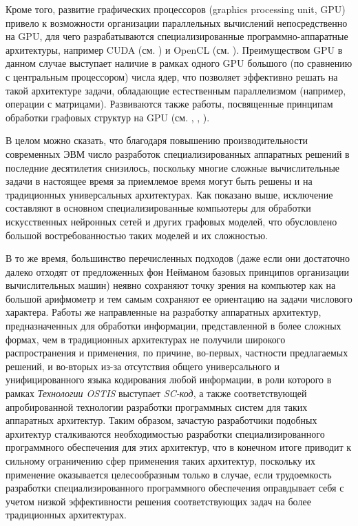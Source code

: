 Кроме того, развитие графических процессоров (graphics processing unit, GPU) привело к возможности организации параллельных вычислений непосредственно на GPU, для чего разрабатываются специализированные программно-аппаратные архитектуры, например CUDA (см. ) и OpenCL (см. ). Преимуществом GPU в данном случае выступает наличие в рамках одного GPU большого (по сравнению с центральным процессором) числа ядер, что позволяет эффективно решать на такой архитектуре задачи, обладающие естественным параллелизмом (например, операции с матрицами). Развиваются также работы, посвященные принципам обработки графовых структур на GPU (см. , , ).

В целом можно сказать, что благодаря повышению производительности современных ЭВМ число разработок специализированных аппаратных решений в последние десятилетия снизилось, поскольку многие сложные вычислительные задачи в настоящее время за приемлемое время могут быть решены и на традиционных универсальных архитектурах. Как показано выше, исключение составляют в основном специализированные компьютеры для обработки искусственных нейронных сетей и других графовых моделей, что обусловлено большой востребованностью таких моделей и их сложностью.

В то же время, большинство перечисленных подходов (даже если они достаточно далеко отходят от предложенных фон Нейманом базовых принципов организации вычислительных машин) неявно сохраняют точку зрения на компьютер как на большой арифмометр и тем самым сохраняют ее ориентацию на задачи числового характера. Работы же направленные на разработку аппаратных архитектур, предназначенных для обработки информации, представленной в более сложных формах, чем в традиционных архитектурах не получили широкого распространения и применения, 
по причине, во-первых, частности предлагаемых решений, и во-вторых из-за отсутствия общего универсального и унифицированного языка кодирования любой информации, в роли которого в рамках \textit{Технологии OSTIS} выступает \textit{SC-код}, а также соответствующей апробированной технологии разработки программных систем для таких аппаратных архитектур. Таким образом, зачастую разработчики подобных архитектур сталкиваются необходимостью разработки специализированного программного обеспечения для этих архитектур, что в конечном итоге приводит к сильному ограничению сфер применения таких архитектур, поскольку их применение оказывается целесообразным только в случае, если трудоемкость разработки специализированного программного обеспечения оправдывает себя с учетом низкой эффективности решения соответствующих задач на более традиционных архитектурах.

